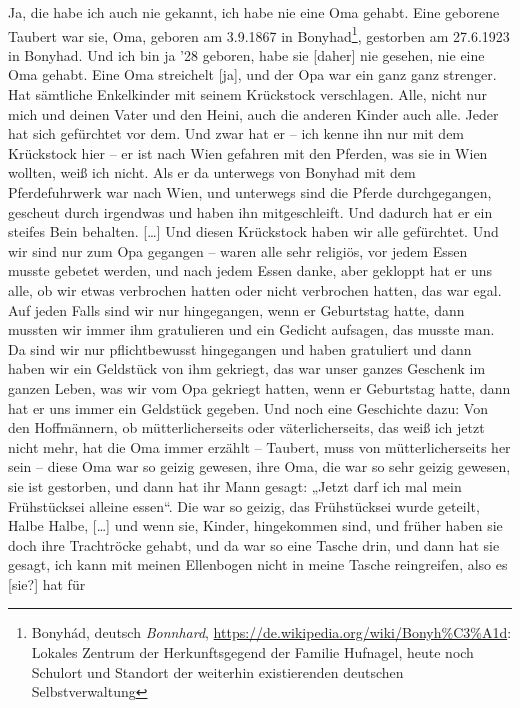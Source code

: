 \documentclass[ngerman,]{article}
\providecommand{\tightlist}{%
  \setlength{\itemsep}{0pt}\setlength{\parskip}{0pt}}
\begin{document}
\begin{multicols}{2}
\begin{description}
\tightlist
\item[Käthe]
Ja, die habe ich auch nie gekannt, ich habe nie eine Oma gehabt. Eine
geborene Taubert war sie, Oma, geboren am 3.9.1867 in Bonyhad\footnote{Bonyhád,
  deutsch \emph{Bonnhard},
  \url{https://de.wikipedia.org/wiki/Bonyh\%C3\%A1d}: Lokales Zentrum
  der Herkunftsgegend der Familie Hufnagel, heute noch Schulort und
  Standort der weiterhin existierenden deutschen Selbstverwaltung},
gestorben am 27.6.1923 in Bonyhad. Und ich bin ja '28 geboren, habe sie
{[}daher{]} nie gesehen, nie eine Oma gehabt. Eine Oma streichelt
{[}ja{]}, und der Opa war ein ganz ganz strenger. Hat sämtliche
Enkelkinder mit seinem Krückstock verschlagen. Alle, nicht nur mich und
deinen Vater und den Heini, auch die anderen Kinder auch alle. Jeder hat
sich gefürchtet vor dem. Und zwar hat er – ich kenne ihn nur mit dem
Krückstock hier – er ist nach Wien gefahren mit den Pferden, was sie in
Wien wollten, weiß ich nicht. Als er da unterwegs von Bonyhad mit dem
Pferdefuhrwerk war nach Wien, und unterwegs sind die Pferde
durchgegangen, gescheut durch irgendwas und haben ihn mitgeschleift. Und
dadurch hat er ein steifes Bein behalten. {[}\ldots{}{]} Und diesen
Krückstock haben wir alle gefürchtet. Und wir sind nur zum Opa gegangen
– waren alle sehr religiös, vor jedem Essen musste gebetet werden, und
nach jedem Essen danke, aber gekloppt hat er uns alle, ob wir etwas
verbrochen hatten oder nicht verbrochen hatten, das war egal. Auf jeden
Falls sind wir nur hingegangen, wenn er Geburtstag hatte, dann mussten
wir immer ihm gratulieren und ein Gedicht aufsagen, das musste man. Da
sind wir nur pflichtbewusst hingegangen und haben gratuliert und dann
haben wir ein Geldstück von ihm gekriegt, das war unser ganzes Geschenk
im ganzen Leben, was wir vom Opa gekriegt hatten, wenn er Geburtstag
hatte, dann hat er uns immer ein Geldstück gegeben. Und noch eine
Geschichte dazu: Von den Hoffmännern, ob mütterlicherseits oder
väterlicherseits, das weiß ich jetzt nicht mehr, hat die Oma immer
erzählt – Taubert, muss von mütterlicherseits her sein – diese Oma war
so geizig gewesen, ihre Oma, die war so sehr geizig gewesen, sie ist
gestorben, und dann hat ihr Mann gesagt: „Jetzt darf ich mal mein
Frühstücksei alleine essen“. Die war so geizig, das Frühstücksei wurde
geteilt, Halbe Halbe, {[}\ldots{}{]} und wenn sie, Kinder, hingekommen
sind, und früher haben sie doch ihre Trachtröcke gehabt, und da war so
eine Tasche drin, und dann hat sie gesagt, ich kann mit meinen
Ellenbogen nicht in meine Tasche reingreifen, also es {[}sie?{]} hat für

\end{description}
\end{multicols}
\end{document}
